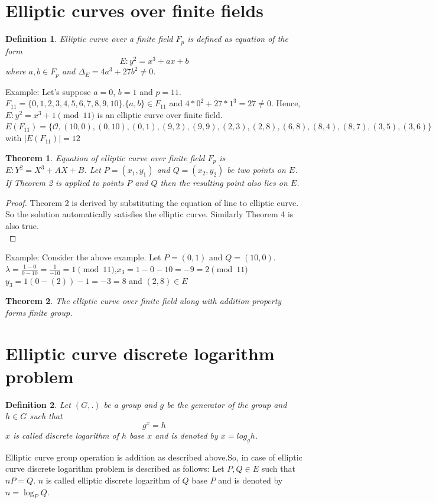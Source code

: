 \documentclass[a4paper,12pt]{report}
\newtheorem{theorem}{Theorem}
\newtheorem{definition}{Definition}
\begin{document}
\section{Elliptic curves over finite fields}
\begin{definition}
	Elliptic curve over a finite field $F_p$ is defined as equation of the form $$E:y^2 = x^3+ax+b$$ where $a,b\in F_p$ and $\Delta_E = 4a^3+27b^2\neq 0$.
\end{definition}
Example:
Let's suppose $a=0$, $b=1$ and $p=11$. \\
$F_{11}=\{0,1,2,3,4,5,6,7,8,9,10\}$.$\{a,b\}\in F_{11}$ and $4*0^2+27*1^3=27\neq 0$. Hence, $E:y^2 = x^3+1 \pmod {11} $ is an elliptic curve over finite field. \\
$E(F_{11}) = \{\mathscr{O},(10,0),(0,10),(0,1),(9,2),(9,9),(2,3),(2,8),(6,8),(8,4),(8,7),(3,5),(3,6)\}$
with $|E(F_{11})|=12$
\begin{theorem}
	Equation of elliptic curve over finite field $F_p$ is $E : Y^2=X^3+
		AX+B$. Let $P=(x_1,y_1)$ and $Q=(x_2,y_2)$ be two points on $E$. If Theorem 2 is applied to points $P$ and $Q$ then the resulting point also lies on $E$.
\end{theorem}
\begin{proof}
	Theorem 2 is derived by substituting the equation of line to elliptic curve. So the solution automatically satisfies the elliptic curve. Similarly Theorem 4 is also true.\\
\end{proof}
Example: Consider the above example. Let $P=(0,1)$ and $Q=(10,0)$.
$\lambda = \frac{1-0}{0-10} = \frac{1}{-	10} = 1 \pmod{11}$,$x_3=1-0-10=-9=2 \pmod{11}$\\ $y_3=1(0-(2))-1=-3=8$ and $(2,8) \in E$ \begin{theorem}
	The elliptic curve over finite field along with addition property forms finite group.
\end{theorem}

\cleardoublepage
\section{Elliptic curve discrete logarithm problem}

\begin{definition}
	Let $(G,.)$ be a group and $g$ be the generator of the group and $h\in G$ such that $$g^x=h$$
	$x$ is called discrete logarithm of $h$ base $x$ and is denoted by $x=log_g h$.
\end{definition}
Elliptic curve group operation is addition as described above.So, in case of elliptic curve discrete logarithm problem is described as follows:
Let $P,Q \in E$ such that $nP=Q$. $n$ is called elliptic discrete logarithm of $Q$ base $P$ and is denoted by $n =\log_P Q$.
\end{document}

